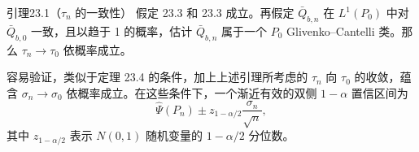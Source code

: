 \begin{bookresult}{引理}{23.1（$\tau_n$ 的一致性）}
假定 23.3 和 23.3 成立。再假定 $\bar Q_{b,n}$ 在 $L^1(P_0)$ 中对 $\bar Q_{b,0}$ 一致，且以趋于 1 的概率，估计 $\bar Q_{b,n}$ 属于一个 $P_0$ Glivenko--Cantelli 类。那么 $\tau_n\to\tau_0$ 依概率成立。
\end{bookresult}

容易验证，类似于定理 23.4 的条件，加上上述引理所考虑的 $\tau_n$ 向 $\tau_0$ 的收敛，蕴含 $\sigma_n\to\sigma_0$ 依概率成立。在这些条件下，一个渐近有效的双侧 $1-\alpha$ 置信区间为
\[
 \hat\Psi(P_n)\pm z_{1-\alpha/2}\frac{\sigma_n}{\sqrt n},
\]
其中 $z_{1-\alpha/2}$ 表示 $N(0,1)$ 随机变量的 $1-\alpha/2$ 分位数。

